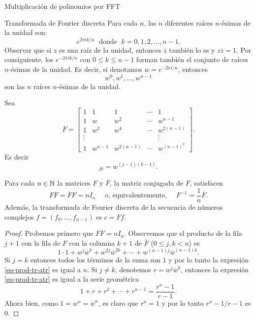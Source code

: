\begin{chapter}{Multiplicación de polinomios por FFT}
\begin{section}{Transformada de Fourier discreta}
    Para cada $n$, las $n$ diferentes raíces $n$-ésimas de la unidad son:
    $$
        e^{2 \pi i k/n} \;\text{ donde }\;  k = 0, 1, 2, \ldots, n-1.
    $$
    Observar que si $z$ es una raíz de la unidad, entonces $\overline{z}$ también lo es y $z\overline{z} =1$.  Por consiguiente, los $e^{-2 \pi i k/n}$ con $0 \le k \le n-1$ forman también el conjunto de raíces $n$-ésimas de la unidad. Es decir, si denotamos $w = e^{-2 \pi i/n}$, entonces
    $$
        w^0, w^1,\ldots,w^{n-1}
    $$ son las $n$ raíces $n$-ésimas de la unidad.

    Sea
    \begin{equation*}
        F = \begin{bmatrix}
            1 & 1       & 1          & \cdots & 1           \\
            1 & w       & w^2        & \cdots & w^{n-1}     \\
            1 & w^2     & w^4        & \cdots & w^{2(n-1)}
            \\ \vdots & &  &  &\vdots \\
            1 & w^{n-1} & w^{2(n-1)} & \cdots & w^{(n-1)^2}
        \end{bmatrix}.
    \end{equation*}
    Es decir
    \begin{equation*}
        [F]_{jk} = w^{(j-1)(k-1)}.
    \end{equation*}


    \begin{teorema}
        Para cada $n \in \mathbb N$ la matrices $F$ y $\overline{F}$, la matriz conjugada de $F$,   satisfacen
        \begin{equation*}
            F \overline{F} = \overline{F}F = nI_n\quad\text{ o,  equivalentemente, }\quad F^{-1} = \frac{1}{n}  \overline{F}.
        \end{equation*}
        Además, la transformada de Fourier discreta de la secuencia de números complejos $f = (f_0,\ldots,f_{n-1})$ es $c = {F}f$.
    \end{teorema}
    \begin{proof}
        Probemos primero que $F \overline{F} = nI_n$. Observemos que el producto de la fila $j + 1 $ con la fila de $F$ con la columna $k +  1$ de $\overline{F}$  ($0 \le j, k < n$) es
        \begin{equation}\label{eq-prod-tr-atr}
            1\cdot1 + w^j\overline{w}^k + w^{2j}\overline{w}^{2k} + \cdots +  w^{(n-1)j}\overline{w}^{(n-1)k}.
        \end{equation}
        Si $j=k$  entonces todos los términos de la suma son $1$ y por lo tanto  la expresión \ref{eq-prod-tr-atr} es igual a $n$. Si $j \not= k$,
        denotemos $r =  w^j\overline{w}^k$,  entonces la expresión \ref{eq-prod-tr-atr} es igual a la serie geométrica
        \begin{equation*}
            1 +  r + r^2+ \cdots +r^{n-1} = \frac{r^n -1}{r -1}.
        \end{equation*}
        Ahora bien, como $1 = w^n = \overline{w}^n$, es claro que $r^n = 1$ y  por lo tanto $r^n -1/r -1$ es $0$.


\end{proof}
\end{section}
\end{chapter}
